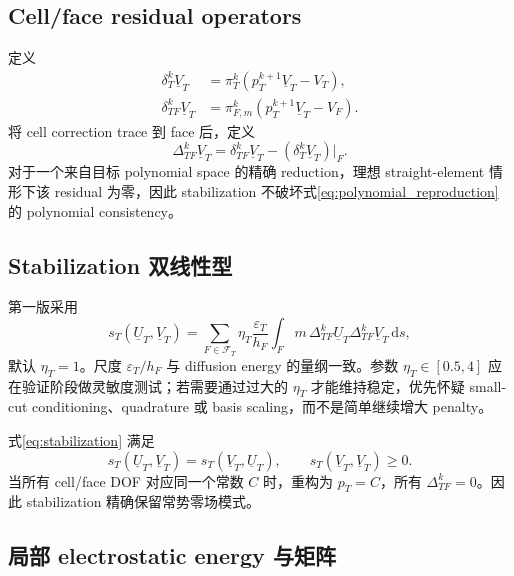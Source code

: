 \documentclass[UTF8,a4paper,11pt]{ctexart}
\newcommand{\dd}{\mathrm{d}}
\newcommand{\eps}{\varepsilon}
\begin{document}
\subsection{Cell/face residual operators}

定义
\begin{align}
\delta_T^k\underline V_T
&=\pi_T^k\left(p_T^{k+1}\underline V_T-V_T\right),\\
\delta_{TF}^k\underline V_T
&=\pi_{F,m}^k\left(p_T^{k+1}\underline V_T-V_F\right).
\end{align}
将 cell correction trace 到 face 后，定义
\begin{equation}
\boxed{
\Delta_{TF}^k\underline V_T
=
\delta_{TF}^k\underline V_T
-
\left(\delta_T^k\underline V_T\right)|_F.
}
\label{eq:stabilization_residual}
\end{equation}
对于一个来自目标 polynomial space 的精确 reduction，理想 straight-element 情形下该 residual 为零，因此 stabilization 不破坏式\eqref{eq:polynomial_reproduction} 的 polynomial consistency。

\subsection{Stabilization 双线性型}

第一版采用
\begin{equation}
\boxed{
 s_T(\underline U_T,\underline V_T)
 =\sum_{F\in\mathcal F_T}
 \eta_T\frac{\eps_T}{h_F}
 \int_Fm\,
 \Delta_{TF}^k\underline U_T
 \Delta_{TF}^k\underline V_T\,\dd s,
}
\label{eq:stabilization}
\end{equation}
默认 \(\eta_T=1\)。尺度 \(\eps_T/h_F\) 与 diffusion energy 的量纲一致。参数 \(\eta_T\in[0.5,4]\) 应在验证阶段做灵敏度测试；若需要通过过大的 \(\eta_T\) 才能维持稳定，优先怀疑 small-cut conditioning、quadrature 或 basis scaling，而不是简单继续增大 penalty。

式\eqref{eq:stabilization} 满足
\[
s_T(\underline U_T,\underline V_T)
=s_T(\underline V_T,\underline U_T),
\qquad
s_T(\underline V_T,\underline V_T)\ge0.
\]
当所有 cell/face DOF 对应同一个常数 \(C\) 时，重构为 \(p_T=C\)，所有 \(\Delta_{TF}^k=0\)。因此 stabilization 精确保留常势零场模式。

\subsection{局部 electrostatic energy 与矩阵}
\end{document}
